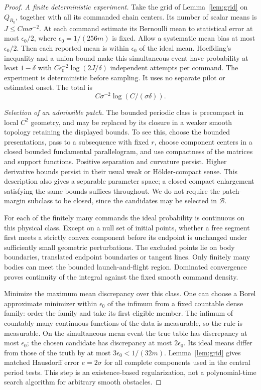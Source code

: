 \begin{proof}
\emph{A finite deterministic experiment.}
Take the grid of Lemma~\ref{lem:grid} on $Q_{R_0}$, together with
all its commanded chain centers. Its number of scalar means is
$J\le C m\sigma^{-2}$. At each command estimate its Bernoulli mean
to statistical error at most $\epsilon_0/2$, where
$\epsilon_0=1/(256m)$ is fixed. Allow a systematic mean bias at most
$\epsilon_0/2$. Then each reported mean is within $\epsilon_0$ of
the ideal mean. Hoeffding's inequality and a union bound make this
simultaneous event have probability at least $1-\delta$ with
$C\epsilon_0^{-2}\log(2J/\delta)$ independent attempts per command.
The experiment is deterministic before sampling. It uses no separate
pilot or estimated onset. The total is
\begin{equation}\label{eq:raw-cost}
                      C\sigma^{-2}\log(C/(\sigma\delta)).
\end{equation}

\emph{Selection of an admissible patch.}
The bounded periodic class is precompact in local $C^2$ geometry, and
may be replaced by its closure in a weaker smooth topology retaining
the displayed bounds. To see this, choose the bounded presentations,
pass to a subsequence with fixed $r$, choose component centers in a
closed bounded fundamental parallelogram, and use compactness of the
matrices and support functions. Positive separation and curvature
persist. Higher derivative bounds persist in their usual weak or
H\"older-compact sense. This description also gives a separable
parameter space; a closed compact enlargement satisfying the same
bounds suffices throughout. We do not require the patch-margin subclass
to be closed, since the candidates may be selected in $\mathcal B$.

For each of the finitely many commands the ideal probability is
continuous on this physical class. Except on a null set of initial
points, whether a free segment first meets a strictly convex component
before its endpoint is unchanged under sufficiently small geometric
perturbations. The excluded points lie on body boundaries, translated
endpoint boundaries or tangent lines. Only finitely many bodies can
meet the bounded launch-and-flight region. Dominated convergence proves
continuity of the integral against the fixed smooth command density.

Minimize the maximum mean discrepancy over this class. One can choose
a Borel approximate minimizer within $\epsilon_0$ of the infimum from
a fixed countable dense family: order the family and take its first
eligible member. The infimum of countably many continuous functions
of the data is measurable, so the rule is measurable. On the simultaneous
mean event the true table has discrepancy at most $\epsilon_0$;
the chosen candidate has discrepancy at most $2\epsilon_0$. Its ideal
means differ from those of the truth by at most $3\epsilon_0<1/(32m)$.
Lemma~\ref{lem:grid} gives matched Hausdorff error $e=2\sigma$ for
all complete components used in the central period tests. This step
is an existence-based regularization, not a polynomial-time search
algorithm for arbitrary smooth obstacles.


\end{proof}
